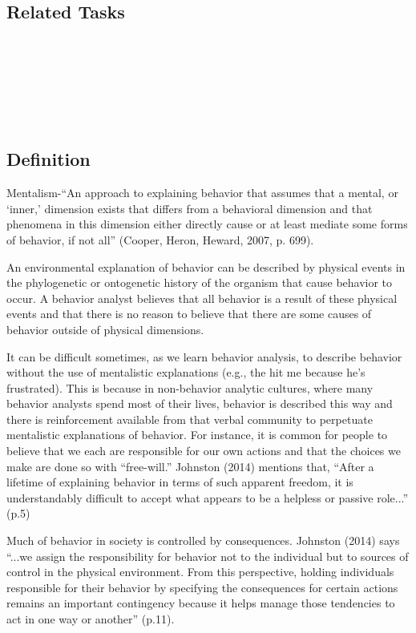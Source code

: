 \subsection{Related Tasks}
\fourbOne{}\\
\fourgFour{}\\
\fourgSix{}\\
\fourkEight{}\\
\fourkNine{}\\
%
%
%
%
%
%
%
\section[\fourFKSeven{}]{\fourFKSeven{}%
              }
\subsection{Definition}
Mentalism-``An approach to explaining behavior that assumes that a mental, or ‘inner,' dimension exists that differs from a behavioral dimension and that phenomena in this dimension either directly cause or at least mediate some forms of behavior, if not all'' (Cooper, Heron, Heward, 2007, p. 699).

An environmental explanation of behavior can be described by physical events in the phylogenetic or ontogenetic history of the organism that cause behavior to occur. A behavior analyst believes that all behavior is a result of these physical events and that there is no reason to believe that there are some causes of behavior outside of physical dimensions.

It can be difficult sometimes, as we learn behavior analysis, to describe behavior without the use of mentalistic explanations (e.g., the hit me because he's frustrated). This is because in non-behavior analytic cultures, where many behavior analysts spend most of their lives, behavior is described this way and there is reinforcement available from that verbal community to perpetuate mentalistic explanations of behavior. For instance, it is common for people to believe that we each are responsible for our own actions and that the choices we make are done so with ``free-will.''  Johnston (2014) mentions that, ``After a lifetime of explaining behavior in terms of such apparent freedom, it is understandably difficult to accept what appears to be a helpless or passive role...'' (p.5) 

Much of behavior in society is controlled by consequences. Johnston (2014) says ``...we assign the responsibility for behavior not to the individual but to sources of control in the physical environment. From this perspective, holding individuals responsible for their behavior by specifying the consequences for certain actions remains an important contingency because it helps manage those tendencies to act in one way or another'' (p.11).
%
%
%
%
